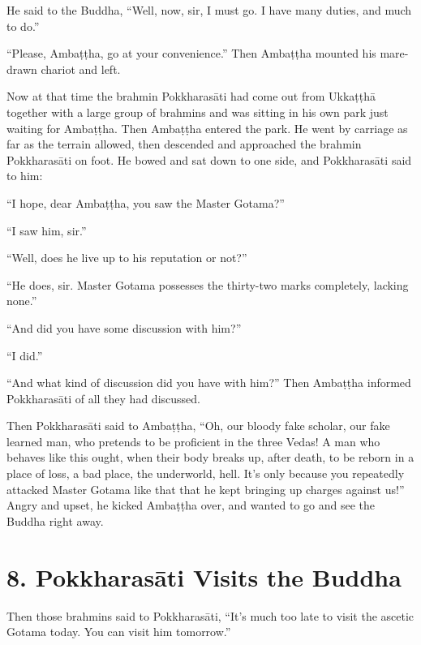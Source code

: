 \documentclass[12pt,openany]{book}%
\begin{document}
He said to the Buddha, “Well, now, sir, I must go. I have many duties, and much to do.” 

“Please, \textsanskrit{Ambaṭṭha}, go at your convenience.” Then \textsanskrit{Ambaṭṭha} mounted his mare-drawn chariot and left. 

Now at that time the brahmin \textsanskrit{Pokkharasāti} had come out from \textsanskrit{Ukkaṭṭhā} together with a large group of brahmins and was sitting in his own park just waiting for \textsanskrit{Ambaṭṭha}. Then \textsanskrit{Ambaṭṭha} entered the park. He went by carriage as far as the terrain allowed, then descended and approached the brahmin \textsanskrit{Pokkharasāti} on foot. He bowed and sat down to one side, and \textsanskrit{Pokkharasāti} said to him: 

“I hope, dear \textsanskrit{Ambaṭṭha}, you saw the Master Gotama?” 

“I saw him, sir.” 

“Well, does he live up to his reputation or not?” 

“He does, sir. Master Gotama possesses the thirty-two marks completely, lacking none.” 

“And did you have some discussion with him?” 

“I did.” 

“And what kind of discussion did you have with him?” Then \textsanskrit{Ambaṭṭha} informed \textsanskrit{Pokkharasāti} of all they had discussed. 

Then \textsanskrit{Pokkharasāti} said to \textsanskrit{Ambaṭṭha}, “Oh, our bloody fake scholar, our fake learned man, who pretends to be proficient in the three Vedas! A man who behaves like this ought, when their body breaks up, after death, to be reborn in a place of loss, a bad place, the underworld, hell. It’s only because you repeatedly attacked Master Gotama like that that he kept bringing up charges against us!” Angry and upset, he kicked \textsanskrit{Ambaṭṭha} over, and wanted to go and see the Buddha right away. 

\section*{8. \textsanskrit{Pokkharasāti} Visits the Buddha }

Then those brahmins said to \textsanskrit{Pokkharasāti}, “It’s much too late to visit the ascetic Gotama today. You can visit him tomorrow.” 
\end{document}
